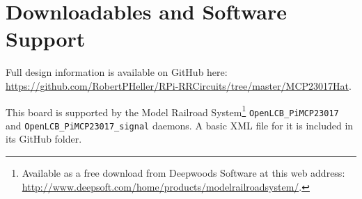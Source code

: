 \section{Downloadables and Software Support}

Full design information is available on GitHub here:
\url{https://github.com/RobertPHeller/RPi-RRCircuits/tree/master/MCP23017Hat}.

This board is supported by the Model Railroad System\footnote{Available as a 
free download from Deepwoods Software at this web address: 
\url{http://www.deepsoft.com/home/products/modelrailroadsystem/}.}
\texttt{OpenLCB\_PiMCP23017} and \texttt{OpenLCB\_PiMCP23017\_signal} daemons.
A basic XML file for it is included in its GitHub folder. 


